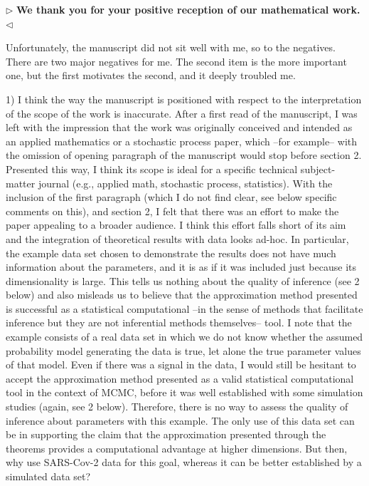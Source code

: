 \documentclass[12pt]{article}
\newenvironment{reply}{$\triangleright$\bfseries}{$\triangleleft$}
\begin{document}
\begin{reply}
	We thank you for your positive reception of our mathematical work.
\end{reply}

Unfortunately, the manuscript did not sit well with me, so to the negatives. There are two major negatives for me. The second item is the more important one, but the first motivates the second, and it deeply troubled me. 

1) I think the way the manuscript is positioned with respect to the interpretation of the scope of the work is inaccurate. After a first read of the manuscript, I was left with the impression that the work was originally conceived and intended as an applied mathematics or a stochastic process paper, which --for example-- with the omission of opening paragraph of the manuscript would stop before section 2. Presented this way, I think its scope is ideal for a specific technical subject-matter journal (e.g., applied math, stochastic process, statistics). With the inclusion of the first paragraph (which I do not find clear, see below specific comments on this), and section 2, I felt that there was an effort to make the paper appealing to a broader audience. I think this effort falls short of its aim and the integration of theoretical results with data looks ad-hoc. In particular, the example data set chosen to demonstrate the results does not have much information about the parameters, and it is as if it was included just because its dimensionality is large. This tells us nothing about the quality of inference (see 2 below) and also misleads us to believe that the approximation method presented is successful as a statistical computational --in the sense of methods that facilitate inference but they are not inferential methods themselves-- tool. I note that the example consists of a real data set in which we do not know whether the assumed probability model generating the data is true, let alone the true parameter values of that model. Even if there was a signal in the data, I would still be hesitant to accept the approximation method presented as a valid statistical computational tool in the context of MCMC, before it was well established with some simulation studies (again, see 2 below). Therefore, there is no way to assess the quality of inference about parameters with this example. The only use of this data set can be in supporting the claim that the approximation presented through the theorems provides a computational advantage at higher dimensions. But then, why use SARS-Cov-2 data for this goal, whereas it can be better established by a simulated data set? 
\end{document}
